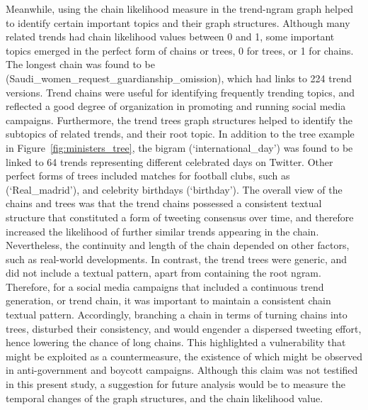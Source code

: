 \documentclass[conference]{IEEEtran}
\begin{document}
{Meanwhile, using the chain likelihood measure in the trend-ngram graph helped 
to identify certain important topics and their graph structures. Although many 
related trends had chain likelihood values between 0 and 1, some important topics 
emerged in the perfect form of chains or trees, 0 for trees, or 1 for chains. 
The longest chain was found to be 
(Saudi\_women\_request\_guardianship\_omission), which had links to 224 trend 
versions. Trend chains were useful for identifying frequently trending topics, 
and reflected a good degree of organization in promoting and running social 
media campaigns. Furthermore, the trend trees graph structures helped to identify 
the subtopics of related trends, and their root topic. In addition to the tree example 
in Figure~\ref{fig:ministers_tree}, the bigram (‘international\_day’) 
was found to be linked to 64 trends representing different celebrated days on Twitter. Other perfect forms 
of trees included matches for football clubs, such as (‘Real\_madrid’), and 
celebrity birthdays (‘birthday’). 
The overall view of the chains and trees was that the trend chains possessed a 
consistent textual structure that constituted a form of tweeting consensus over time, 
and therefore increased the likelihood of further similar trends appearing in the chain. 
Nevertheless, the continuity and length of the chain depended on other factors, such 
as real-world developments. In contrast, the trend trees were generic, and did not 
include a textual pattern, apart from containing the root ngram. 
Therefore, for a social media campaigns that included a continuous trend generation,
or trend chain, it was important to maintain a consistent chain textual pattern. Accordingly,
branching a chain in terms of turning chains into trees, disturbed their consistency, and 
would engender a dispersed tweeting effort, hence lowering the chance of long chains. 
This highlighted a vulnerability that might be exploited as a countermeasure, the existence 
of which might be observed in anti-government and boycott campaigns. Although this 
claim was not testified in this present study, a suggestion for future analysis would be to 
measure the temporal changes of the graph structures, and the chain likelihood value.  


}
\end{document}
